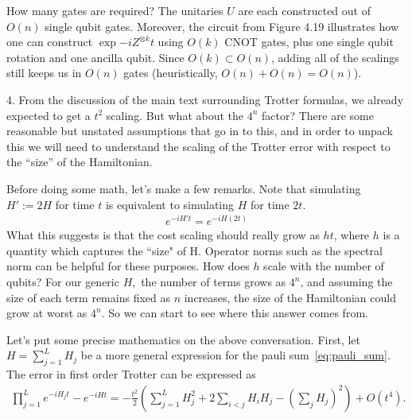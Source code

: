 \documentclass{book}
\begin{document}
    How many gates are required? The unitaries $U$ are each constructed out of $O(n)$ single qubit gates. Moreover, the circuit from Figure 4.19 illustrates how one can construct $\exp{-i Z^{\otimes k} t}$ using $O(k)$ CNOT gates, plus one single qubit rotation and one ancilla qubit. Since $O(k) \subset O(n)$, adding all of the scalings still keeps us in $O(n)$ gates (heuristically, $O(n) + O(n) = O(n)$). 

    4. From the discussion of the main text surrounding Trotter formulas, we already expected to get a $t^2$ scaling. But what about the $4^n$ factor? There are some reasonable but unstated assumptions that go in to this, and in order to unpack this we will need to understand the scaling of the Trotter error with respect to the ``size'' of the Hamiltonian.

    Before doing some math, let's make a few remarks. Note that simulating $H' := 2H$ for time $t$ is equivalent to simulating $H$ for time $2t$. 
    \begin{align}
        e^{-iH't} = e^{-iH(2t)}
    \end{align}
    What this suggests is that the cost scaling should really grow as $h t$, where $h$ is a quantity which captures the ``size" of H. Operator norms such as the spectral norm can be helpful for these purposes. How does $h$ scale with the number of qubits? For our generic $H,$ the number of terms grows as $4^n$, and assuming the size of each term remains fixed as $n$ increases, the size of the Hamiltonian could grow at worst as $4^n$. So we can start to see where this answer comes from.

    Let's put some precise mathematics on the above conversation. First, let $H = \sum_{j=1}^L H_j$ be a more general expression for the pauli sum~\eqref{eq:pauli_sum}. The error in first order Trotter can be expressed as
    \begin{align}\label{eq:prob4.3_troterror}
        \prod_{j=1}^L e^{-i H_j t} - e^{-i H t} = -\frac{t^2}{2} \left(\sum_{j=1}^L H_j^2 + 2 \sum_{i < j} H_i H_j - (\sum_j H_j)^2\right) + O(t^4).
    \end{align}
\end{document}
